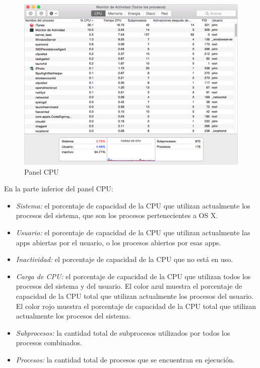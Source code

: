 \documentclass[a4paper,11pt]{article}
\begin{document}
\begin{figure}[H]
  \centering
  \includegraphics[width=1\textwidth]{01macActivityMonitorCPU}
  \caption{Panel CPU}
  \label{fig:macActivityMonitorCPU}
\end{figure}

En la parte inferior del panel CPU:

\begin{itemize}
  \item \textit{Sistema:} el porcentaje de capacidad de la CPU que utilizan actualmente los procesos del sistema, que son los procesos pertenecientes a OS X.
  \item \textit{Usuario:} el porcentaje de capacidad de la CPU que utilizan actualmente las apps abiertas por el usuario, o los procesos abiertos por esas apps.
  \item \textit{Inactividad:} el porcentaje de capacidad de la CPU que no está en uso.
  \item \textit{Carga de CPU:} el porcentaje de capacidad de la CPU que utilizan todos los procesos del sistema y del usuario. El color azul muestra el porcentaje de capacidad de la CPU total que utilizan actualmente los procesos del usuario. El color rojo muestra el porcentaje de capacidad de la CPU total que utilizan actualmente los procesos del sistema.
  \item \textit{Subprocesos:} la cantidad total de subprocesos utilizados por todos los procesos combinados.
  \item \textit{Procesos:} la cantidad total de procesos que se encuentran en ejecución.

\end{itemize}
\end{document}
